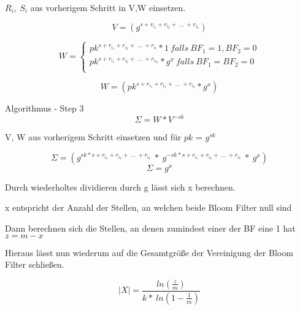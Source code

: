 \documentclass{beamer}
\begin{document}
\begin{frame}
	\begin{arrowlist}
		\item 	 $R_{i}, \  S_{i}$ aus vorherigem Schritt in V,W einsetzen.
		
	\end{arrowlist}

	$$ V = (g^{s + r_{i_{1}} + r_{i_{2}} + \ ...\ +r_{i_{k}}})$$
	
	  \[
	  W =\left\{
	  \begin{array}{ll}
	  pk^{s + r_{i_{1}} + r_{i_{2}} + \ ...\ +r_{i_{l}}}*1 \ falls \ BF_{1} = 1,BF_{2} = 0 \\
	  pk^{s + r_{i_{1}} + r_{i_{2}} + \ ...\ +r_{i_{m}}}*g^{x} \ falls \ BF_{1} = BF_{2} = 0\\
	  \end{array}
	  \right.
	  \]
	  
	 $$ W= (pk^{s + r_{i_{1}} + r_{i_{2}} + \ ...\ +r_{i_{k}}}* g^x)$$

\end{frame}


\begin{frame}{Algorithmus - Step 3}
	$$\Sigma = W * V^{-sk}$$
	\begin{arrowlist}
	 \item V, W aus vorherigem Schritt einsetzen und für $pk$ = $g^{sk}$ 
   \end{arrowlist}
   \vskip 0.1cm 
   
$$\Sigma = (g^{sk * s + r_{i_{1}} + r_{i_{2}} + \ ...\ +r_{i_{k}}} \ * \ g^{-sk * s + r_{i_{1}} + r_{i_{2}} + \ ...\ +r_{i_{k}}} \ * \ g^x) $$
$$\Sigma = g^x$$
\end{frame}

\begin{frame}
\begin{arrowlist}
	\item Durch wiederholtes dividieren durch g lässt sich x berechnen.
	\item x entspricht der Anzahl der Stellen, an welchen beide Bloom Filter null sind
	\item Dann berechnen sich die Stellen, an denen zumindest einer der BF eine 1 hat $z = m - x$
	\item Hieraus lässt nun wiederum auf die Gesamtgröße der Vereinigung der Bloom Filter schließen.
\end{arrowlist}
$$ |X| = \frac{ln( \frac{z}{m})}{k* \ ln(1- \frac{1}{m})}$$
\end{frame}
\end{document}
